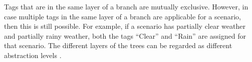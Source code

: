 Tags that are in the same layer of a branch are mutually exclusive. However, in case multiple tags in the same layer of a branch are applicable for a scenario, then this is still possible. For example, if a scenario has partially clear weather and partially rainy weather, both the tags ``Clear'' and ``Rain'' are assigned for that scenario. The different layers of the trees can be regarded as different abstraction levels \cite{Bonnin2014}.

\cbend

%
%
